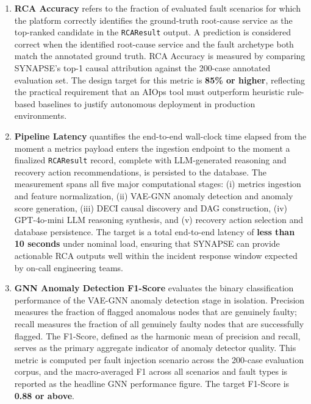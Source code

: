 \begin{enumerate}[label=\textbf{\Alph*.},leftmargin=1.2cm]

    \item \textbf{RCA Accuracy} refers to the fraction of evaluated fault scenarios for which the platform correctly identifies the ground-truth root-cause service as the top-ranked candidate in the \texttt{RCAResult} output. A prediction is considered correct when the identified root-cause service and the fault archetype both match the annotated ground truth. RCA Accuracy is measured by comparing SYNAPSE's top-1 causal attribution against the 200-case annotated evaluation set. The design target for this metric is \textbf{85\% or higher}, reflecting the practical requirement that an AIOps tool must outperform heuristic rule-based baselines to justify autonomous deployment in production environments.

    \item \textbf{Pipeline Latency} quantifies the end-to-end wall-clock time elapsed from the moment a metrics payload enters the ingestion endpoint to the moment a finalized \texttt{RCAResult} record, complete with LLM-generated reasoning and recovery action recommendations, is persisted to the database. The measurement spans all five major computational stages: (i) metrics ingestion and feature normalization, (ii) VAE-GNN anomaly detection and anomaly score generation, (iii) DECI causal discovery and DAG construction, (iv) GPT-4o-mini LLM reasoning synthesis, and (v) recovery action selection and database persistence. The target is a total end-to-end latency of \textbf{less than 10 seconds} under nominal load, ensuring that SYNAPSE can provide actionable RCA outputs well within the incident response window expected by on-call engineering teams.

    \item \textbf{GNN Anomaly Detection F1-Score} evaluates the binary classification performance of the VAE-GNN anomaly detection stage in isolation. Precision measures the fraction of flagged anomalous nodes that are genuinely faulty; recall measures the fraction of all genuinely faulty nodes that are successfully flagged. The F1-Score, defined as the harmonic mean of precision and recall, serves as the primary aggregate indicator of anomaly detector quality. This metric is computed per fault injection scenario across the 200-case evaluation corpus, and the macro-averaged F1 across all scenarios and fault types is reported as the headline GNN performance figure. The target F1-Score is \textbf{0.88 or above}.


\end{enumerate}
